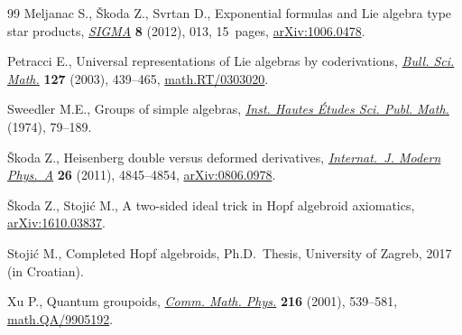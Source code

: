 \documentclass[10pt,a4paper]{amsart}
\numberwithin{equation}{section}
\begin{document}
\begin{thebibliography}{99}
Meljanac S., \v{S}koda Z., Svrtan D., Exponential formulas and {L}ie algebra
 type star products, \href{https://doi.org/10.3842/SIGMA.2012.013}{\textit{SIGMA}} \textbf{8} (2012), 013, 15~pages,
 \href{https://arxiv.org/abs/1006.0478}{arXiv:1006.0478}.

Petracci E., Universal representations of {L}ie algebras by coderivations,
 \href{https://doi.org/10.1016/S0007-4497(03)00041-1}{\textit{Bull. Sci. Math.}} \textbf{127} (2003), 439--465,
 \href{https://arxiv.org/abs/math.RT/0303020}{math.RT/0303020}.

Sweedler M.E., Groups of simple algebras, \href{https://doi.org/10.1007/BF02685882}{\textit{Inst. Hautes \'Etudes Sci.
 Publ. Math.}} (1974), 79--189.

\v{S}koda Z., Heisenberg double versus deformed derivatives,
 \href{https://doi.org/10.1142/S0217751X11054772}{\textit{Internat.~J. Modern Phys.~A}} \textbf{26} (2011), 4845--4854,
 \href{https://arxiv.org/abs/0806.0978}{arXiv:0806.0978}.

\v{S}koda Z., Stoji\'c M., A two-sided ideal trick in {H}opf algebroid
 axiomatics, \href{https://arxiv.org/abs/1610.03837}{arXiv:1610.03837}.

Stoji\'c M., Completed {H}opf algebroids, Ph.D.~Thesis, University of Zagreb, 2017 (in Croatian).

Xu P., Quantum groupoids, \href{https://doi.org/10.1007/s002200000334}{\textit{Comm. Math. Phys.}} \textbf{216} (2001),
 539--581, \href{https://arxiv.org/abs/math.QA/9905192}{math.QA/9905192}.

\end{thebibliography}
\end{document}
